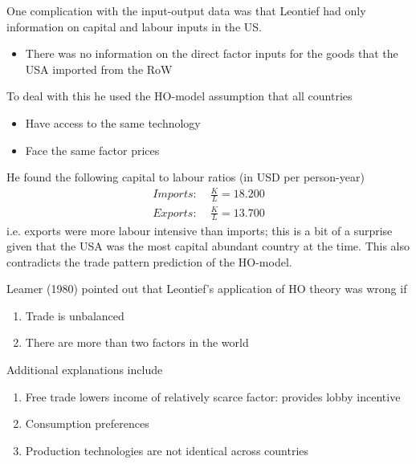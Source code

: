 \documentclass{beamer}
\begin{document}
\begin{frame}
 One complication with the input-output data was that Leontief had only information on capital and labour inputs in the US.
 \begin{itemize}
   \item There was no information on the direct factor inputs for the goods that the USA imported from the RoW
 \end{itemize}
 \medskip
 To deal with this he used the HO-model assumption that all countries
 \begin{itemize}
   \item Have access to the same technology
   \item Face the same factor prices
 \end{itemize}
\end{frame}

\begin{frame}
 He found the following capital to labour ratios (in USD per person-year)
 \begin{align*}
 Imports: & \; \frac{K}{L} = 18.200 \\
 Exports: & \; \frac{K}{L} = 13.700
 \end{align*}
 \medskip
 i.e. exports were more labour intensive than imports; this is a bit of a surprise given that the USA was the most capital abundant country at the time. 
 This also contradicts the trade pattern prediction of the HO-model.
\end{frame}

\begin{frame}
  Leamer (1980) pointed out that Leontief's application of HO theory was wrong if
  \begin{enumerate}
    \item Trade is unbalanced
    \item There are more than two factors in the world
  \end{enumerate}
  \medskip
  Additional explanations include 
  \begin{enumerate}
   \item Free trade lowers income of relatively scarce factor: provides lobby incentive
   \item Consumption preferences
   \item Production technologies are not identical across countries
 \end{enumerate}
\end{frame}
\end{document}
